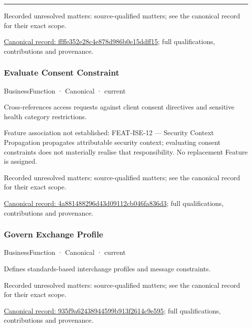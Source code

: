 \medskip\hrule\medskip

{\small Recorded unresolved matters: source-qualified matters; see the canonical record for their exact scope.}\par
{\footnotesize \href{../../../../continuum/business/business-function/ffffe352e28c4e878d986b0e15ddff15.md}{Canonical record: ffffe352e28c4e878d986b0e15ddff15}; full qualifications, contributions and provenance.}\par
\subsubsection{Evaluate Consent Constraint}

\label{element:4a881488296d43d09112cb046fa836d3}
{\small BusinessFunction · Canonical · current}\par

Cross-references access requests against client consent directives and sensitive health category restrictions.



Feature association not established: FEAT-ISE-12 — Security Context Propagation propagates attributable security context; evaluating consent constraints does not materially realise that responsibility. No replacement Feature is assigned.


{\small Recorded unresolved matters: source-qualified matters; see the canonical record for their exact scope.}\par
{\footnotesize \href{../../../../continuum/business/business-function/4a881488296d43d09112cb046fa836d3.md}{Canonical record: 4a881488296d43d09112cb046fa836d3}; full qualifications, contributions and provenance.}\par
\subsubsection{Govern Exchange Profile}

\label{element:935f9a62438944599b913f2614c9e595}
{\small BusinessFunction · Canonical · current}\par

Defines standards-based interchange profiles and message constraints.


{\small Recorded unresolved matters: source-qualified matters; see the canonical record for their exact scope.}\par
{\footnotesize \href{../../../../continuum/business/business-function/935f9a62438944599b913f2614c9e595.md}{Canonical record: 935f9a62438944599b913f2614c9e595}; full qualifications, contributions and provenance.}\par
